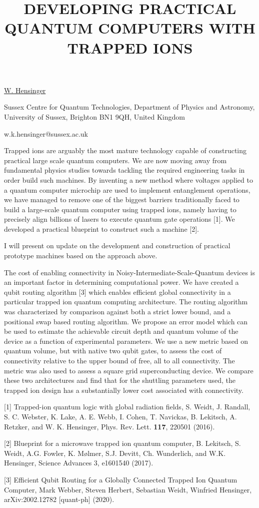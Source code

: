 \title{DEVELOPING PRACTICAL QUANTUM COMPUTERS WITH TRAPPED IONS}

\underline{W. Hensinger} 

{\normalsize{\vspace{-4mm}
Sussex Centre for Quantum Technologies, Department of Physics and Astronomy, University of Sussex, Brighton BN1 9QH, United Kingdom




\email w.k.hensinger@sussex.ac.uk}}

Trapped ions are arguably the most mature technology capable of constructing practical large scale quantum computers. We are now moving away from fundamental physics studies towards tackling the required engineering tasks in order build such machines. By inventing a new method where voltages applied to a quantum computer microchip are used to implement entanglement operations, we have managed to remove one of the biggest barriers traditionally faced to build a large-scale quantum computer using trapped ions, namely having to precisely align billions of lasers to execute quantum gate operations [1]. We developed a practical blueprint to construct such a machine [2].

I will present on update on the development and construction of practical prototype machines based on the approach above.

The cost of enabling connectivity in Noisy-Intermediate-Scale-Quantum devices is an important factor in determining computational power. We have created a qubit routing algorithm [3] which enables efficient global connectivity in a particular trapped ion quantum computing architecture. The routing algorithm was characterized by comparison against both a strict lower bound, and a positional swap based routing algorithm. We propose an error model which can be used to estimate the achievable circuit depth and quantum volume of the device as a function of experimental parameters. We use a new metric based on quantum volume, but with native two qubit gates, to assess the cost of connectivity relative to the upper bound of free, all to all connectivity. The metric was also used to assess a square grid superconducting device. We compare these two architectures and find that for the shuttling parameters used, the trapped ion design has a substantially lower cost associated with connectivity.

{\normalsize
[1]        Trapped-ion quantum logic with global radiation fields, S. Weidt, J. Randall, S. C. Webster, K. Lake, A. E. Webb, I. Cohen, T. Navickas, B. Lekitsch, A. Retzker, and W. K. Hensinger, Phys. Rev. Lett. {\bf 117}, 220501 (2016).
\vsp

[2]     Blueprint for a microwave trapped ion quantum computer, B. Lekitsch, S. Weidt, A.G. Fowler, K. Mølmer, S.J. Devitt, Ch. Wunderlich, and W.K. Hensinger, Science Advances 3, e1601540 (2017).
\vsp

[3]     Efficient Qubit Routing for a Globally Connected Trapped Ion Quantum Computer, Mark Webber, Steven Herbert, Sebastian Weidt, Winfried Hensinger, arXiv:2002.12782 [quant-ph] (2020).
}

\vspace{\baselineskip}